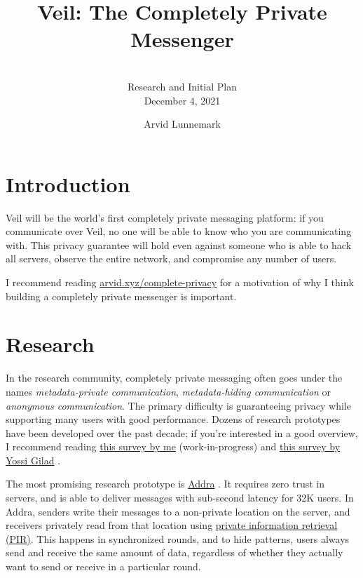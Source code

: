 \documentclass[sigconf, nonacm, balance=false, natbib=false, screen]{acmart}
\title{Veil: The Completely Private Messenger}
\subtitle{\vspace{-5px} \\ Research and Initial Plan \\ December 4, 2021}
\author{Arvid Lunnemark}
\begin{document}
\maketitle

\section{Introduction}

Veil will be the world's first completely private messaging platform: if you communicate over Veil, no one will be able to know who you are communicating with. This privacy guarantee will hold even against someone who is able to hack all servers, observe the entire network, and compromise any number of users.

I recommend reading \href{https://arvid.xyz/complete-privacy}{arvid.xyz/complete-privacy} \cite{arvid} for a motivation of why I think building a completely private messenger is important.

\section{Research}

In the research community, completely private messaging often goes under the names \textit{metadata-private communication}, \textit{metadata-hiding communication} or \textit{anonymous communication}. The primary difficulty is guaranteeing privacy while supporting many users with good performance. Dozens of research prototypes have been developed over the past decade; if you're interested in a good overview, I recommend reading \href{https://arvid.xyz/ac-research}{this survey by me} \cite{arvid2021survey} (work-in-progress) and \href{http://www.mit.edu/~yossigi/metadata.pdf}{this survey by Yossi Gilad} \cite{gilad2019metadata}. 

The most promising research prototype is \href{https://www.usenix.org/conference/osdi21/presentation/ahmad}{Addra} \cite{ahmad2021addra}. It requires zero trust in servers, and is able to deliver messages with sub-second latency for 32K users. 
In Addra, senders write their messages to a non-private location on the server, and receivers privately read from that location using \href{https://en.wikipedia.org/wiki/Private_information_retrieval}{private information retrieval (PIR)}. This happens in synchronized rounds, and to hide patterns, users always send and receive the same amount of data, regardless of whether they actually want to send or receive in a particular round.
\end{document}
